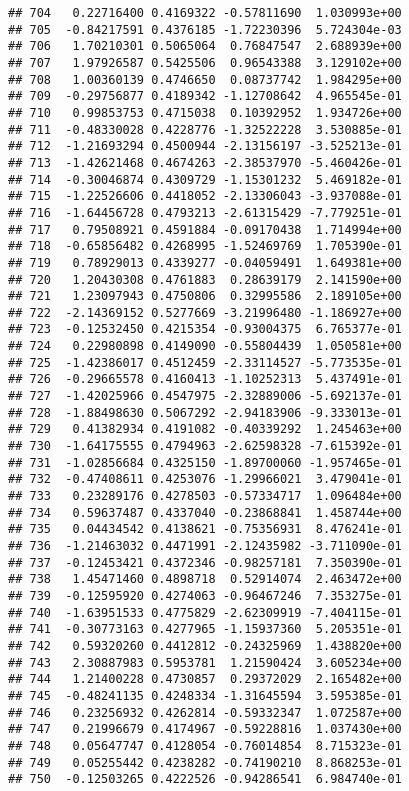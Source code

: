 \documentclass[
]{article}
\begin{document}
\begin{verbatim}
## 704   0.22716400 0.4169322 -0.57811690  1.030993e+00
## 705  -0.84217591 0.4376185 -1.72230396  5.724304e-03
## 706   1.70210301 0.5065064  0.76847547  2.688939e+00
## 707   1.97926587 0.5425506  0.96543388  3.129102e+00
## 708   1.00360139 0.4746650  0.08737742  1.984295e+00
## 709  -0.29756877 0.4189342 -1.12708642  4.965545e-01
## 710   0.99853753 0.4715038  0.10392952  1.934726e+00
## 711  -0.48330028 0.4228776 -1.32522228  3.530885e-01
## 712  -1.21693294 0.4500944 -2.13156197 -3.525213e-01
## 713  -1.42621468 0.4674263 -2.38537970 -5.460426e-01
## 714  -0.30046874 0.4309729 -1.15301232  5.469182e-01
## 715  -1.22526606 0.4418052 -2.13306043 -3.937088e-01
## 716  -1.64456728 0.4793213 -2.61315429 -7.779251e-01
## 717   0.79508921 0.4591884 -0.09170438  1.714994e+00
## 718  -0.65856482 0.4268995 -1.52469769  1.705390e-01
## 719   0.78929013 0.4339277 -0.04059491  1.649381e+00
## 720   1.20430308 0.4761883  0.28639179  2.141590e+00
## 721   1.23097943 0.4750806  0.32995586  2.189105e+00
## 722  -2.14369152 0.5277669 -3.21996480 -1.186927e+00
## 723  -0.12532450 0.4215354 -0.93004375  6.765377e-01
## 724   0.22980898 0.4149090 -0.55804439  1.050581e+00
## 725  -1.42386017 0.4512459 -2.33114527 -5.773535e-01
## 726  -0.29665578 0.4160413 -1.10252313  5.437491e-01
## 727  -1.42025966 0.4547975 -2.32889006 -5.692137e-01
## 728  -1.88498630 0.5067292 -2.94183906 -9.333013e-01
## 729   0.41382934 0.4191082 -0.40339292  1.245463e+00
## 730  -1.64175555 0.4794963 -2.62598328 -7.615392e-01
## 731  -1.02856684 0.4325150 -1.89700060 -1.957465e-01
## 732  -0.47408611 0.4253076 -1.29966021  3.479041e-01
## 733   0.23289176 0.4278503 -0.57334717  1.096484e+00
## 734   0.59637487 0.4337040 -0.23868841  1.458744e+00
## 735   0.04434542 0.4138621 -0.75356931  8.476241e-01
## 736  -1.21463032 0.4471991 -2.12435982 -3.711090e-01
## 737  -0.12453421 0.4372346 -0.98257181  7.350390e-01
## 738   1.45471460 0.4898718  0.52914074  2.463472e+00
## 739  -0.12595920 0.4274063 -0.96467246  7.353275e-01
## 740  -1.63951533 0.4775829 -2.62309919 -7.404115e-01
## 741  -0.30773163 0.4277965 -1.15937360  5.205351e-01
## 742   0.59320260 0.4412812 -0.24325969  1.438820e+00
## 743   2.30887983 0.5953781  1.21590424  3.605234e+00
## 744   1.21400228 0.4730857  0.29372029  2.165482e+00
## 745  -0.48241135 0.4248334 -1.31645594  3.595385e-01
## 746   0.23256932 0.4262814 -0.59332347  1.072587e+00
## 747   0.21996679 0.4174967 -0.59228816  1.037430e+00
## 748   0.05647747 0.4128054 -0.76014854  8.715323e-01
## 749   0.05255442 0.4238282 -0.74190210  8.868253e-01
## 750  -0.12503265 0.4222526 -0.94286541  6.984740e-01

\end{verbatim}
\end{document}
